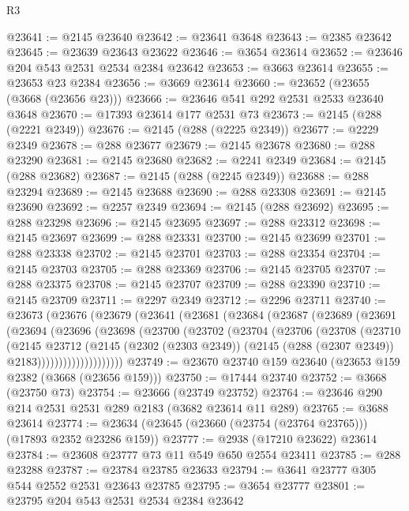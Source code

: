 \begin{lexlean}{R3}
\begin{coremodule}
@23641 := @2145 @23640
@23642 := @23641 @3648
@23643 := @2385 @23642
@23645 := @23639 @23643 @23622
@23646 := @3654 @23614
@23652 := @23646 @204 @543 @2531 @2534 @2384 @23642
@23653 := @3663 @23614
@23655 := @23653 @23 @2384
@23656 := @3669 @23614
@23660 := @23652 (@23655 (@3668 (@23656 @23)))
@23666 := @23646 @541 @292 @2531 @2533 @23640 @3648
@23670 := @17393 @23614 @177 @2531 @73
@23673 := @2145 (@288 (@2221 @2349))
@23676 := @2145 (@288 (@2225 @2349))
@23677 := @2229 @2349
@23678 := @288 @23677
@23679 := @2145 @23678
@23680 := @288 @23290
@23681 := @2145 @23680
@23682 := @2241 @2349
@23684 := @2145 (@288 @23682)
@23687 := @2145 (@288 (@2245 @2349))
@23688 := @288 @23294
@23689 := @2145 @23688
@23690 := @288 @23308
@23691 := @2145 @23690
@23692 := @2257 @2349
@23694 := @2145 (@288 @23692)
@23695 := @288 @23298
@23696 := @2145 @23695
@23697 := @288 @23312
@23698 := @2145 @23697
@23699 := @288 @23331
@23700 := @2145 @23699
@23701 := @288 @23338
@23702 := @2145 @23701
@23703 := @288 @23354
@23704 := @2145 @23703
@23705 := @288 @23369
@23706 := @2145 @23705
@23707 := @288 @23375
@23708 := @2145 @23707
@23709 := @288 @23390
@23710 := @2145 @23709
@23711 := @2297 @2349
@23712 := @2296 @23711
@23740 := @23673
    (@23676
      (@23679
        (@23641
          (@23681
            (@23684
              (@23687
                (@23689
                  (@23691
                    (@23694
                      (@23696
                        (@23698
                          (@23700
                            (@23702
                              (@23704
                                (@23706
                                  (@23708
                                    (@23710
                                      (@2145
                                        @23712
                                        (@2145
                                          (@2302 (@2303 @2349))
                                          (@2145 (@288 (@2307 @2349)) @2183))))))))))))))))))))
@23749 := @23670 @23740 @159 @23640 (@23653 @159 @2382 (@3668 (@23656 @159)))
@23750 := @17444 @23740
@23752 := @3668 (@23750 @73)
@23754 := @23666 (@23749 @23752)
@23764 := @23646 @290 @214 @2531 @2531 @289 @2183 (@3682 @23614 @11 @289)
@23765 := @3688 @23614
@23774 := @23634 (@23645 (@23660 (@23754 (@23764 @23765))) (@17893 @2352 @23286 @159))
@23777 := @2938 (@17210 @23622) @23614
@23784 := @23608 @23777 @73 @11 @549 @650 @2554 @23411
@23785 := @288 @23288
@23787 := @23784 @23785 @23633
@23794 := @3641 @23777 @305 @544 @2552 @2531 @23643 @23785
@23795 := @3654 @23777
@23801 := @23795 @204 @543 @2531 @2534 @2384 @23642

\end{coremodule}
\end{lexlean}
